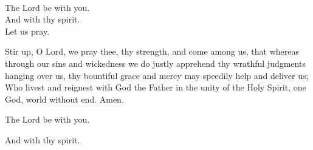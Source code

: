 \\
  \rubric{\Vbar}The Lord be with you.
\\
  \rubric{\Rbar}And with thy spirit.
\\
Let us pray.

Stir up, O Lord, we pray thee, thy strength, and come among us, that whereas through our sins and wickedness we do justly apprehend thy wrathful judgments hanging over us, thy bountiful grace and mercy may speedily help and deliver us; Who livest and reignest with God the Father in the unity of the Holy Spirit, one God, world without end.\rubric{\Rbar} Amen.

  \rubric{\Vbar}The Lord be with you.

  \rubric{\Rbar}And with thy spirit.
